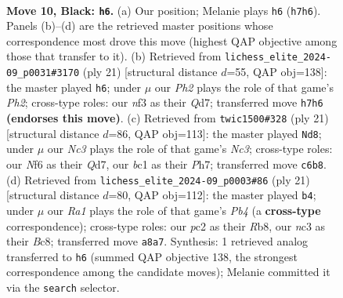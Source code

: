 \documentclass[11pt]{article}
\begin{document}
\clearpage

\begin{figure}[p]\centering
\begin{subfigure}{0.46\textwidth}\centering
\resizebox{\linewidth}{!}{%
\newchessgame
\chessboard[
  setfen={r2q1rk1/1bp1bppp/p1np1n2/1p2p3/4P3/PBN2N1P/1PPP1PP1/R1BQR1K1 b - - 0 10},
  showmover=false,
  pgfstyle=straightmove, color=movearrow, markmove={h7-h6}
]}
\caption{}
\end{subfigure}\hfill
\begin{subfigure}{0.46\textwidth}\centering
\resizebox{\linewidth}{!}{%
\newchessgame
\chessboard[
  setfen={r4rk1/1bpqbppp/p1np1n2/1p2p3/4P3/PBNP1N1P/1PP2PP1/R1BQR1K1 b - - 2 11},
  showmover=false,
  pgfstyle=straightmove, color=movearrow, markmove={h7-h6}
]}
\caption{}
\end{subfigure}
\\[4pt]
\begin{subfigure}{0.46\textwidth}\centering
\resizebox{\linewidth}{!}{%
\newchessgame
\chessboard[
  setfen={r4rk1/1bpqbppp/p1np1n2/1p2p3/4P3/PB1P1N1P/1PPB1PP1/RN1QR1K1 b - - 0 11},
  showmover=false,
  pgfstyle=straightmove, color=movearrow, markmove={c6-d8}
]}
\caption{}
\end{subfigure}\hfill
\begin{subfigure}{0.46\textwidth}\centering
\resizebox{\linewidth}{!}{%
\newchessgame
\chessboard[
  setfen={1rbq1rk1/2p1bppp/2np1n2/1p2p3/4P3/1BP2N1P/1P1P1PP1/RNBQR1K1 b - - 0 11},
  showmover=false,
  pgfstyle=straightmove, color=movearrow, markmove={b5-b4}
]}
\caption{}
\end{subfigure}
\caption{\textbf{Move 10, Black: \texttt{h6}.} (a) Our position; Melanie plays \texttt{h6} (\texttt{h7h6}). Panels (b)--(d) are the retrieved master positions whose correspondence most drove this move (highest QAP objective among those that transfer to it). (b) Retrieved from \texttt{lichess\_elite\_2024-09\_p0031\#3170} (ply 21) [structural distance $d$=55, QAP obj=138]: the master played \texttt{h6}; under $\mu$ our \emph{Ph2} plays the role of that game's \emph{Ph2}; cross-type roles: our \emph{n}f3 as their \emph{Q}d7; transferred move \texttt{h7h6} \textbf{(endorses this move)}. (c) Retrieved from \texttt{twic1500\#328} (ply 21) [structural distance $d$=86, QAP obj=113]: the master played \texttt{Nd8}; under $\mu$ our \emph{Nc3} plays the role of that game's \emph{Nc3}; cross-type roles: our \emph{N}f6 as their \emph{Q}d7, our \emph{b}c1 as their \emph{P}h7; transferred move \texttt{c6b8}. (d) Retrieved from \texttt{lichess\_elite\_2024-09\_p0003\#86} (ply 21) [structural distance $d$=80, QAP obj=112]: the master played \texttt{b4}; under $\mu$ our \emph{Ra1} plays the role of that game's \emph{Pb4} (a \textbf{cross-type} correspondence); cross-type roles: our \emph{p}c2 as their \emph{R}b8, our \emph{n}c3 as their \emph{B}c8; transferred move \texttt{a8a7}. Synthesis: 1 retrieved analog transferred to \texttt{h6} (summed QAP objective 138, the strongest correspondence among the candidate moves); Melanie committed it via the \texttt{search} selector.}
\label{fig:thought-m19}
\end{figure}
\end{document}
